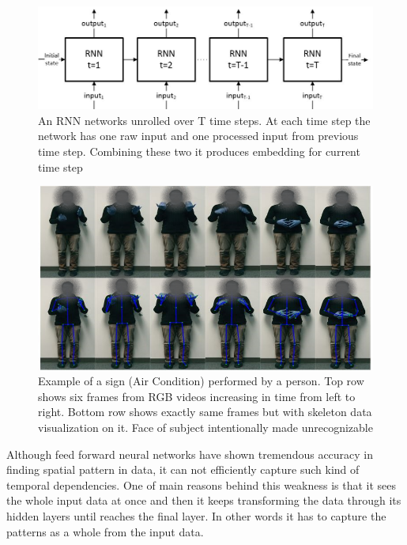\documentclass[10pt,twocolumn,letterpaper]{article}
\begin{document}
\begin{figure}[h]
	\begin{center}
		\includegraphics[width=\linewidth]{rnn_network}
	\end{center}
	\caption{An RNN networks unrolled over T time steps. At each time step the network has one raw input and one processed input from previous time step. Combining these two it produces embedding for current time step}
	\label{fig:rnn_network}
\end{figure}
\begin{figure}
	\begin{center}
		\includegraphics[width=.8\linewidth]{ac_person1_faceoff}
	\end{center}
	\caption{Example of a sign (Air Condition) performed by a person. Top row shows six frames from RGB videos increasing in time from left to right. Bottom row shows exactly same frames but with skeleton data visualization on it. Face of subject intentionally made unrecognizable}
	\label{fig:ac_person1}
\end{figure} 
Although feed forward neural networks have shown tremendous accuracy in finding spatial pattern in data, it can not efficiently capture such kind of temporal dependencies. One of main reasons behind this weakness is that it sees the whole input data at once and then it keeps transforming the data through its hidden layers until reaches the final layer. In other words it has to capture the patterns as a whole from the input data. %
\end{document}
